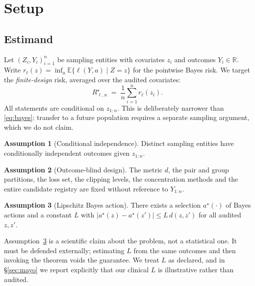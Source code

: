 \documentclass[11pt]{article}
\theoremstyle{definition}
\newtheorem{assumption}{Assumption}
\newcommand{\risk}{R^{\star}}
\newcommand{\E}{\mathbb{E}}
\begin{document}
\section{Setup}

\subsection{Estimand}

Let $(Z_i,Y_i)_{i=1}^n$ be sampling entities with covariates $z_i$ and outcomes $Y_i\in\mathbb{R}$. Write $r_\ell(z)=\inf_a \E\{\ell(Y,a)\mid Z=z\}$ for the pointwise Bayes risk. We target the \emph{finite-design} risk, averaged over the audited covariates:
\begin{equation}
\risk_{\ell,n} \;=\; \frac1n\sum_{i=1}^n r_\ell(z_i).
\label{eq:finite}
\end{equation}
All statements are conditional on $z_{1:n}$. This is deliberately narrower than \eqref{eq:bayes}: transfer to a future population requires a separate sampling argument, which we do not claim.

\begin{assumption}[Conditional independence]\label{as:indep}
Distinct sampling entities have conditionally independent outcomes given $z_{1:n}$.
\end{assumption}

\begin{assumption}[Outcome-blind design]\label{as:blind}
The metric $d$, the pair and group partitions, the loss set, the clipping levels, the concentration methods and the entire candidate registry are fixed without reference to $Y_{1:n}$.
\end{assumption}

\begin{assumption}[Lipschitz Bayes action]\label{as:lip}
There exists a selection $a^\star(\cdot)$ of Bayes actions and a constant $L$ with $|a^\star(z)-a^\star(z')|\le L\,d(z,z')$ for all audited $z,z'$.
\end{assumption}

Assumption~\ref{as:lip} is a scientific claim about the problem, not a statistical one. It must be defended externally; estimating $L$ from the same outcomes and then invoking the theorem voids the guarantee. We treat $L$ as declared, and in \S\ref{sec:mayo} we report explicitly that our clinical $L$ is illustrative rather than audited.
\end{document}
